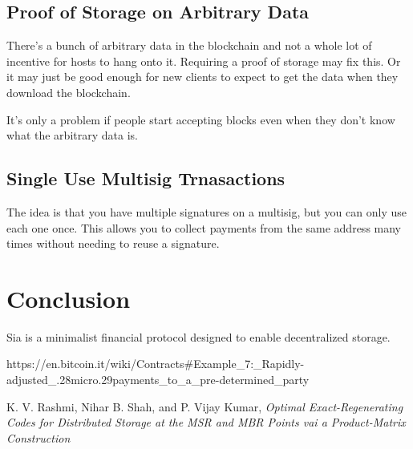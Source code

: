 \documentclass[twocolumn]{article}
\begin{document}
\subsection{Proof of Storage on Arbitrary Data}
There's a bunch of arbitrary data in the blockchain and not a whole lot of incentive for hosts to hang onto it.
Requiring a proof of storage may fix this.
Or it may just be good enough for new clients to expect to get the data when they download the blockchain.

It's only a problem if people start accepting blocks even when they don't know what the arbitrary data is.

\subsection{Single Use Multisig Trnasactions}
The idea is that you have multiple signatures on a multisig, but you can only use each one once.
This allows you to collect payments from the same address many times without needing to reuse a signature.

\section{Conclusion}
Sia is a minimalist financial protocol designed to enable decentralized storage.

\onecolumn
\begin{thebibliography}{2}

	https://en.bitcoin.it/wiki/Contracts\#Example\_7:\_Rapidly-adjusted\_.28micro.29payments\_to\_a\_pre-determined\_party

	K. V. Rashmi, Nihar B. Shah, and P. Vijay Kumar,
	\emph{Optimal Exact-Regenerating Codes for Distributed Storage at the MSR and MBR Points vai a Product-Matrix Construction}

\end{thebibliography}
\end{document}
